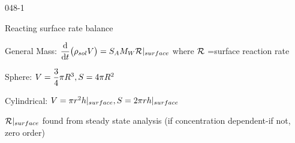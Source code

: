 \begin{mitframe}{048-1}
\begin{listone}
\begin{listtwo}
            \end{listtwo}
\item Reacting surface rate balance
\item General Mass: $\dfrac{\mathrm{d}}{\mathrm{d}t}\big(\dens_{sol}\vol\big)=\entropy_{\helmholtz}\mw\surfreac|_{surface}$ where $\surfreac$ =surface reaction rate

				\begin{listtwo}
                		\item Sphere: $\vol =\dfrac{3}{4}\pi{R}^3,  \entropy=4\pi{R}^2$
                        \item Cylindrical: $\vol =\pi{r}^2h|_{surface},  \entropy=2\pi{r}h|_{surface}$
                        \item $\surfreac|_{surface}$ found from steady state analysis (if concentration dependent-if not, zero order)
                \end{listtwo}
\end{listone} 
\end{mitframe}